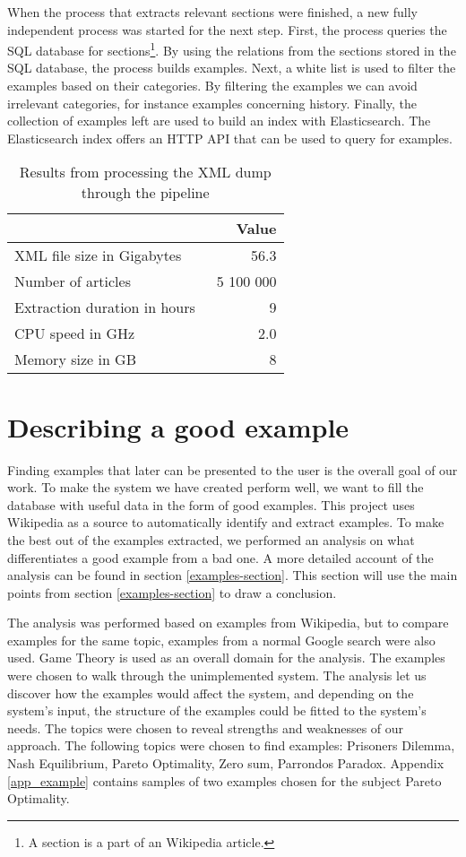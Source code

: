 When the process that extracts relevant sections were finished, a new fully independent process was started for the next step. First, the process queries the SQL database for sections\footnote{A section is a part of an Wikipedia article.}. By using the relations from the sections stored in the SQL database, the process builds examples. Next, a white list is used to filter the examples based on their categories. By filtering the examples we can avoid irrelevant categories, for instance examples concerning history. Finally, the collection of examples left are used to build an index with Elasticsearch. The Elasticsearch index offers an HTTP API that can be used to query for examples.


\begin{table}[H]
\centering
\begin{tabular} {|| p{15em} | r ||} 
 \hline
  & Value \\ [0.5ex] 
 \hline
XML file size in Gigabytes & 56.3 \\
Number of articles & ~5 100 000 \\
Extraction duration in hours & ~9 \\
CPU speed in GHz & 2.0 \\
Memory size in GB & 8 \\

 \hline
\end{tabular}
\caption{Results from processing the XML dump through the pipeline}
\label{table:run_statistics}
\end{table}


\section{Describing a good example} \label{5:example}
Finding examples that later can be presented to the user is the overall goal of our work. To make the system we have created perform well, we want to fill the database with useful data in the form of good examples. This project uses Wikipedia as a source to automatically identify and extract examples. To make the best out of the examples extracted, we performed an analysis on what differentiates a good example from a bad one. A more detailed account of the analysis can be found in section \ref{examples-section}. This section will use the main points from section \ref{examples-section} to draw a conclusion.

The analysis was performed based on examples from Wikipedia, but to compare examples for the same topic, examples from a normal Google search were also used. Game Theory is used as an overall domain for the analysis. The examples were chosen to walk through the unimplemented system. The analysis let us discover how the examples would affect the system, and depending on the system's input, the structure of the examples could be fitted to the system's needs.
The topics were chosen to reveal strengths and weaknesses of our approach. The following topics were chosen to find examples: Prisoners Dilemma, Nash Equilibrium, Pareto Optimality, Zero sum, Parrondos Paradox. Appendix \ref{app_example} contains samples of two examples chosen for the subject Pareto Optimality. 

